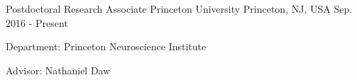 \begin{cventries}
  \cventry
    {Postdoctoral Research Associate}
    {Princeton University}
    {Princeton, NJ, USA}
    {Sep. 2016 - Present}
    {
      \begin{cvitems}
        \item {Department: Princeton Neuroscience Institute}
        \item {Advisor: Nathaniel Daw}
      \end{cvitems}
    }
\end{cventries}
